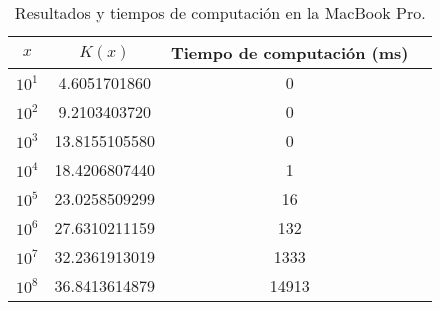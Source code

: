 \begin{table}[htbp]
    \centering
    \caption{Resultados y tiempos de computaci\'on en la MacBook Pro.}
    \begin{tabular}{cccc}
      \toprule
      \textbf{\(x\)} & \textbf{\(K(x)\)} & \textbf{Tiempo de computaci\'on (ms)} \\
      \midrule
      \(10^1\) & 4.6051701860 & 0 \\
      \(10^2\) & 9.2103403720 & 0 \\
      \(10^3\) & 13.8155105580 & 0 \\
      \(10^4\) & 18.4206807440 & 1 \\
      \(10^5\) & 23.0258509299 & 16 \\
      \(10^6\) & 27.6310211159 & 132 \\
      \(10^7\) & 32.2361913019 & 1333 \\
      \(10^8\) & 36.8413614879 & 14913 \\
      \bottomrule
    \end{tabular}
\end{table}
